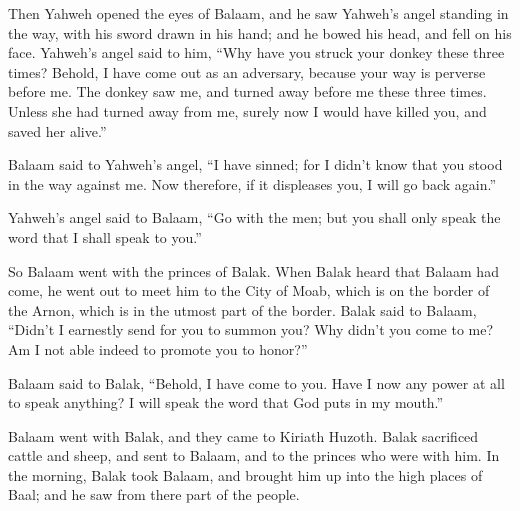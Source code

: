{\par }{\PP {}Then Yahweh opened the eyes of Balaam, and he saw Yahweh’s angel standing in the way, with his sword drawn in his hand; and he bowed his head, and fell on his face.
Yahweh’s angel said to him, “Why have you struck your donkey these three times? Behold, I have come out as an adversary, because your way is perverse before me.
The donkey saw me, and turned away before me these three times. Unless she had turned away from me, surely now I would have killed you, and saved her alive.”
\par }{\PP {}Balaam said to Yahweh’s angel, “I have sinned; for I didn’t know that you stood in the way against me. Now therefore, if it displeases you, I will go back again.”
\par }{\PP {}Yahweh’s angel said to Balaam, “Go with the men; but you shall only speak the word that I shall speak to you.”
\par }{\PP So Balaam went with the princes of Balak.
When Balak heard that Balaam had come, he went out to meet him to the City of Moab, which is on the border of the Arnon, which is in the utmost part of the border.
Balak said to Balaam, “Didn’t I earnestly send for you to summon you? Why didn’t you come to me? Am I not able indeed to promote you to honor?”
\par }{\PP {}Balaam said to Balak, “Behold, I have come to you. Have I now any power at all to speak anything? I will speak the word that God puts in my mouth.”
\par }{\PP {}Balaam went with Balak, and they came to Kiriath Huzoth.
Balak sacrificed cattle and sheep, and sent to Balaam, and to the princes who were with him.
In the morning, Balak took Balaam, and brought him up into the high places of Baal; and he saw from there part of the people.

}
